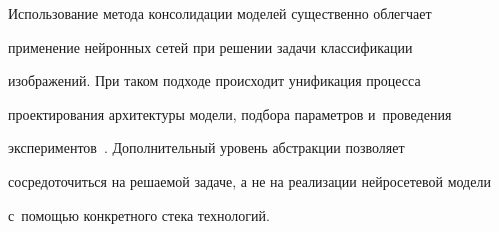   


  Использование метода консолидации моделей существенно облегчает 


применение нейронных сетей при решении задачи классификации 


изображений. При таком подходе происходит унификация процесса 


проектирования архитектуры модели, подбора параметров и~проведения 


экспериментов~\cite{14-ar}. Дополнительный уровень абстракции позволяет 


сосредоточиться на решаемой задаче, а не на реализации нейросетевой модели 


с~по\-мощью конкретного стека технологий. 


  


